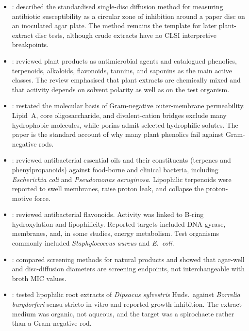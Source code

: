 \begin{itemize}

\item \citet{bauer1966}: described the standardised single-disc diffusion method for measuring antibiotic susceptibility as a circular zone of inhibition around a paper disc on an inoculated agar plate. The method remains the template for later plant-extract disc tests, although crude extracts have no CLSI interpretive breakpoints.

\item \citet{cowan1999}: reviewed plant products as antimicrobial agents and catalogued phenolics, terpenoids, alkaloids, flavonoids, tannins, and saponins as the main active classes. The review emphasised that plant extracts are chemically mixed and that activity depends on solvent polarity as well as on the test organism.

\item \citet{nikaido2003}: restated the molecular basis of Gram-negative outer-membrane permeability. Lipid~A, core oligosaccharide, and divalent-cation bridges exclude many hydrophobic molecules, while porins admit selected hydrophilic solutes. The paper is the standard account of why many plant phenolics fail against Gram-negative rods.

\item \citet{burt2004}: reviewed antibacterial essential oils and their constituents (terpenes and phenylpropanoids) against food-borne and clinical bacteria, including \textit{Escherichia coli} and \textit{Pseudomonas aeruginosa}. Lipophilic terpenoids were reported to swell membranes, raise proton leak, and collapse the proton-motive force.

\item \citet{cushnie2005}: reviewed antibacterial flavonoids. Activity was linked to B-ring hydroxylation and lipophilicity. Reported targets included DNA gyrase, membranes, and, in some studies, energy metabolism. Test organisms commonly included \textit{Staphylococcus aureus} and \textit{E.\ coli}.

\item \citet{valgas2007}: compared screening methods for natural products and showed that agar-well and disc-diffusion diameters are screening endpoints, not interchangeable with broth MIC values.

\item \citet{liebold2011}: tested lipophilic root extracts of \textit{Dipsacus sylvestris} Huds.\ against \textit{Borrelia burgdorferi} sensu stricto in vitro and reported growth inhibition. The extract medium was organic, not aqueous, and the target was a spirochaete rather than a Gram-negative rod.


\end{itemize}
